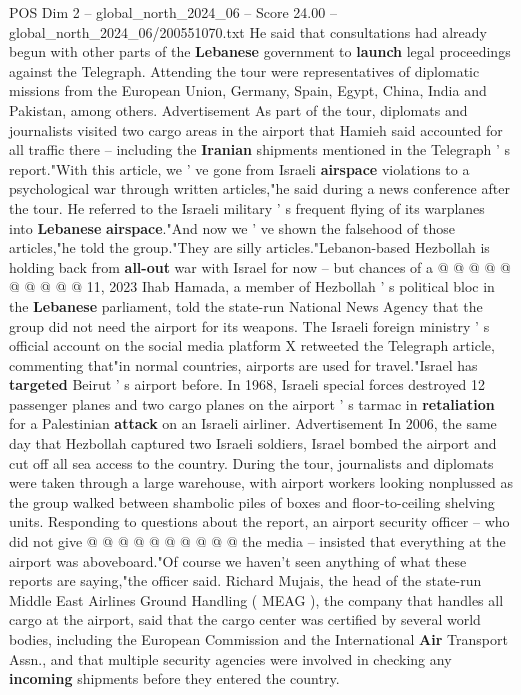 \begin{textsample}{POS Dim 2 – global\_north\_2024\_06 – Score 24.00 – global\_north\_2024\_06/200551070.txt}
He said that consultations had already begun with other parts of the \textbf{Lebanese} government to \textbf{launch} legal proceedings against the Telegraph.
Attending the tour were representatives of diplomatic missions from the European Union, Germany, Spain, Egypt, China, India and Pakistan, among others.
Advertisement As part of the tour, diplomats and journalists visited two cargo areas in the airport that Hamieh said accounted for all traffic there -- including the \textbf{Iranian} shipments mentioned in the Telegraph ' s report."With this article, we ' ve gone from Israeli \textbf{airspace} violations to a psychological war through written articles,"he said during a news conference after the tour.
He referred to the Israeli military ' s frequent flying of its warplanes into \textbf{Lebanese} \textbf{airspace}."And now we ' ve shown the falsehood of those articles,"he told the group."They are silly articles."Lebanon-based Hezbollah is holding back from \textbf{all-out} war with Israel for now -- but chances of a @ @ @ @ @ @ @ @ @ @ 11, 2023 Ihab Hamada, a member of Hezbollah ' s political bloc in the \textbf{Lebanese} parliament, told the state-run National News Agency that the group did not need the airport for its weapons.
The Israeli foreign ministry ' s official account on the social media platform X retweeted the Telegraph article, commenting that"in normal countries, airports are used for travel."Israel has \textbf{targeted} Beirut ' s airport before.
In 1968, Israeli special forces destroyed 12 passenger planes and two cargo planes on the airport ' s tarmac in \textbf{retaliation} for a Palestinian \textbf{attack} on an Israeli airliner.
Advertisement In 2006, the same day that Hezbollah captured two Israeli soldiers, Israel bombed the airport and cut off all sea access to the country.
During the tour, journalists and diplomats were taken through a large warehouse, with airport workers looking nonplussed as the group walked between shambolic piles of boxes and floor-to-ceiling shelving units.
Responding to questions about the report, an airport security officer -- who did not give @ @ @ @ @ @ @ @ @ @ the media -- insisted that everything at the airport was aboveboard."Of course we haven't seen anything of what these reports are saying,"the officer said.
Richard Mujais, the head of the state-run Middle East Airlines Ground Handling ( MEAG ), the company that handles all cargo at the airport, said that the cargo center was certified by several world bodies, including the European Commission and the International \textbf{Air} Transport Assn., and that multiple security agencies were involved in checking any \textbf{incoming} shipments before they entered the country.

\end{textsample}

